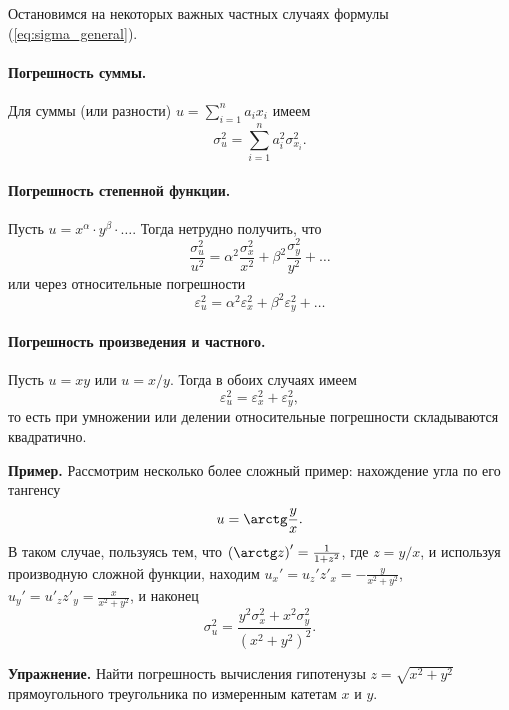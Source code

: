 \documentclass[10pt]{article}
\begin{document}
Остановимся на некоторых важных частных случаях формулы (\ref{eq:sigma_general}).

\paragraph{Погрешность суммы.}

Для суммы (или разности) $u=\sum\limits _{i=1}^{n}a_{i}x_{i}$ имеем
\begin{equation}
\sigma_{u}^{2}=\sum_{i=1}^{n}a_{i}^{2}\sigma_{x_{i}}^{2}.
\end{equation}


\paragraph{Погрешность степенной функции.}

Пусть $u=x^{\alpha}\cdot y^{\beta}\cdot\ldots$. Тогда нетрудно получить,
что
\[
\frac{\sigma_{u}^{2}}{u^{2}}=\alpha^{2}\frac{\sigma_{x}^{2}}{x^{2}}+\beta^{2}\frac{\sigma_{y}^{2}}{y^{2}}+\ldots
\]
или через относительные погрешности
\begin{equation}
\varepsilon_{u}^{2}=\alpha^{2}\varepsilon_{x}^{2}+\beta^{2}\varepsilon_{y}^{2}+\ldots\label{eq:espilon_power}
\end{equation}


\paragraph{Погрешность произведения и частного.}

Пусть $u=xy$ или $u=x/y$. Тогда в обоих случаях имеем
\begin{equation}
\varepsilon_{u}^{2}=\varepsilon_{x}^{2}+\varepsilon_{y}^{2},
\end{equation}
то есть при умножении или делении относительные погрешности складываются
квадратично.

{\footnotesize
\textbf{Пример.} Рассмотрим несколько
более сложный пример: нахождение угла по его тангенсу 
\[
u=\arctg\frac{y}{x}.
\]
В таком случае, пользуясь тем, что $\left(\arctg z\right)'=\frac{1}{1+z^{2}}$,
где $z=y/x$, и используя производную сложной функции, находим $u_{x}'=u_{z}'z'_{x}=-\frac{y}{x^{2}+y^{2}}$,
$u_{y}'=u'_{z}z'_{y}=\frac{x}{x^{2}+y^{2}}$, и наконец 
\[
\sigma_{u}^{2}=\frac{y^{2}\sigma_{x}^{2}+x^{2}\sigma_{y}^{2}}{\left(x^{2}+y^{2}\right)^{2}}.
\]
}%

{\footnotesize
\textbf{Упражнение.} Найти погрешность
вычисления гипотенузы $z=\sqrt{x^{2}+y^{2}}$ прямоугольного треугольника
по измеренным катетам $x$ и $y$.\par
}%
\end{document}
